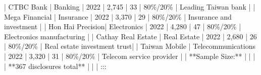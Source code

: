 \documentclass[
  12pt,
]{article}
\newenvironment{Shaded}{\begin{snugshade}}{\end{snugshade}}
\newcommand{\NormalTok}[1]{\textcolor[rgb]{0.00,0.23,0.31}{#1}}
\newcommand{\PreprocessorTok}[1]{\textcolor[rgb]{0.68,0.00,0.00}{#1}}
\begin{document}
\begin{Shaded}
\begin{Highlighting}[]
\PreprocessorTok{|}\NormalTok{ CTBC Bank        }\PreprocessorTok{|}\NormalTok{ Banking             }\PreprocessorTok{|}\NormalTok{ 2022                }\PreprocessorTok{|}\NormalTok{ 2,745                         }\PreprocessorTok{|}\NormalTok{ 33                        }\PreprocessorTok{|}\NormalTok{ 80\%/20\%             }\PreprocessorTok{|}\NormalTok{ Leading Taiwan bank          }\PreprocessorTok{|}
\PreprocessorTok{|}\NormalTok{ Mega Financial   }\PreprocessorTok{|}\NormalTok{ Insurance           }\PreprocessorTok{|}\NormalTok{ 2022                }\PreprocessorTok{|}\NormalTok{ 3,370                         }\PreprocessorTok{|}\NormalTok{ 29                        }\PreprocessorTok{|}\NormalTok{ 80\%/20\%             }\PreprocessorTok{|}\NormalTok{ Insurance and investment     }\PreprocessorTok{|}
\PreprocessorTok{|}\NormalTok{ Hon Hai Precision}\PreprocessorTok{|}\NormalTok{ Electronics         }\PreprocessorTok{|}\NormalTok{ 2022                }\PreprocessorTok{|}\NormalTok{ 4,280                         }\PreprocessorTok{|}\NormalTok{ 47                        }\PreprocessorTok{|}\NormalTok{ 80\%/20\%             }\PreprocessorTok{|}\NormalTok{ Electronics manufacturing    }\PreprocessorTok{|}
\PreprocessorTok{|}\NormalTok{ Cathay Real Estate }\PreprocessorTok{|}\NormalTok{ Real Estate         }\PreprocessorTok{|}\NormalTok{ 2022                }\PreprocessorTok{|}\NormalTok{ 2,680                         }\PreprocessorTok{|}\NormalTok{ 26                        }\PreprocessorTok{|}\NormalTok{ 80\%/20\%             }\PreprocessorTok{|}\NormalTok{ Real estate investment trust}\PreprocessorTok{|}
\PreprocessorTok{|}\NormalTok{ Taiwan Mobile    }\PreprocessorTok{|}\NormalTok{ Telecommunications  }\PreprocessorTok{|}\NormalTok{ 2022                }\PreprocessorTok{|}\NormalTok{ 3,320                         }\PreprocessorTok{|}\NormalTok{ 31                        }\PreprocessorTok{|}\NormalTok{ 80\%/20\%             }\PreprocessorTok{|}\NormalTok{ Telecom service provider     }\PreprocessorTok{|}
\PreprocessorTok{|}\NormalTok{ **Sample Size:**  |                    |                     |                               | **367 disclosures total**  }\PreprocessorTok{|}                     \PreprocessorTok{|}                             \PreprocessorTok{|}
\NormalTok{:::}


\end{Highlighting}
\end{Shaded}
\end{document}
